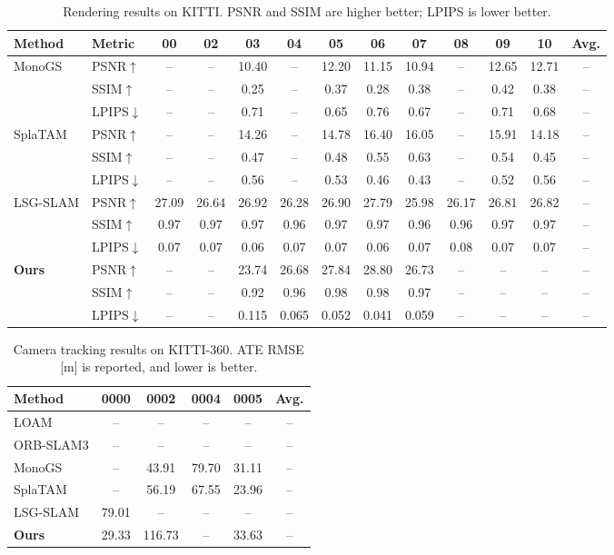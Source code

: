 \begin{table}[t]
\caption{Rendering results on KITTI. PSNR and SSIM are higher better; LPIPS is lower better.}
\label{tab:kitti_mapping}
\centering
\footnotesize
\setlength{\tabcolsep}{4pt}
\begin{tabular}{llccccccccccc}
\toprule
Method & Metric & 00 & 02 & 03 & 04 & 05 & 06 & 07 & 08 & 09 & 10 & Avg. \\
\midrule
MonoGS & PSNR$\uparrow$ & -- & -- & 10.40 & -- & 12.20 & 11.15 & 10.94 & -- & 12.65 & 12.71 & -- \\
 & SSIM$\uparrow$ & -- & -- & 0.25 & -- & 0.37 & 0.28 & 0.38 & -- & 0.42 & 0.38 & -- \\
 & LPIPS$\downarrow$ & -- & -- & 0.71 & -- & 0.65 & 0.76 & 0.67 & -- & 0.71 & 0.68 & -- \\
\midrule
SplaTAM & PSNR$\uparrow$ & -- & -- & 14.26 & -- & 14.78 & 16.40 & 16.05 & -- & 15.91 & 14.18 & -- \\
 & SSIM$\uparrow$ & -- & -- & 0.47 & -- & 0.48 & 0.55 & 0.63 & -- & 0.54 & 0.45 & -- \\
 & LPIPS$\downarrow$ & -- & -- & 0.56 & -- & 0.53 & 0.46 & 0.43 & -- & 0.52 & 0.56 & -- \\
\midrule
LSG-SLAM & PSNR$\uparrow$ & 27.09 & 26.64 & 26.92 & 26.28 & 26.90 & 27.79 & 25.98 & 26.17 & 26.81 & 26.82 & -- \\
 & SSIM$\uparrow$ & 0.97 & 0.97 & 0.97 & 0.96 & 0.97 & 0.97 & 0.96 & 0.96 & 0.97 & 0.97 & -- \\
 & LPIPS$\downarrow$ & 0.07 & 0.07 & 0.06 & 0.07 & 0.07 & 0.06 & 0.07 & 0.08 & 0.07 & 0.07 & -- \\
\midrule
\textbf{Ours} & PSNR$\uparrow$ & -- & -- & 23.74 & 26.68 & 27.84 & 28.80 & 26.73 & -- & -- & -- & -- \\
 & SSIM$\uparrow$ & -- & -- & 0.92 & 0.96 & 0.98 & 0.98 & 0.97 & -- & -- & -- & -- \\
 & LPIPS$\downarrow$ & -- & -- & 0.115 & 0.065 & 0.052 & 0.041 & 0.059 & -- & -- & -- & -- \\
\bottomrule
\end{tabular}
\end{table}

\begin{table}[t]
\caption{Camera tracking results on KITTI-360. ATE RMSE [m] is reported, and lower is better.}
\label{tab:kitti360_localization}
\centering
\footnotesize
\setlength{\tabcolsep}{8pt}
\begin{tabular}{lccccc}
\toprule
Method & 0000 & 0002 & 0004 & 0005 & Avg. \\
\midrule
LOAM & -- & -- & -- & -- & -- \\
ORB-SLAM3 & -- & -- & -- & -- & -- \\
MonoGS & -- & 43.91 & 79.70 & 31.11 & -- \\
SplaTAM & -- & 56.19 & 67.55 & 23.96 & -- \\
LSG-SLAM & 79.01 & -- & -- & -- & -- \\
\textbf{Ours} & 29.33 & 116.73 & -- & 33.63 & -- \\
\bottomrule
\end{tabular}
\end{table}

